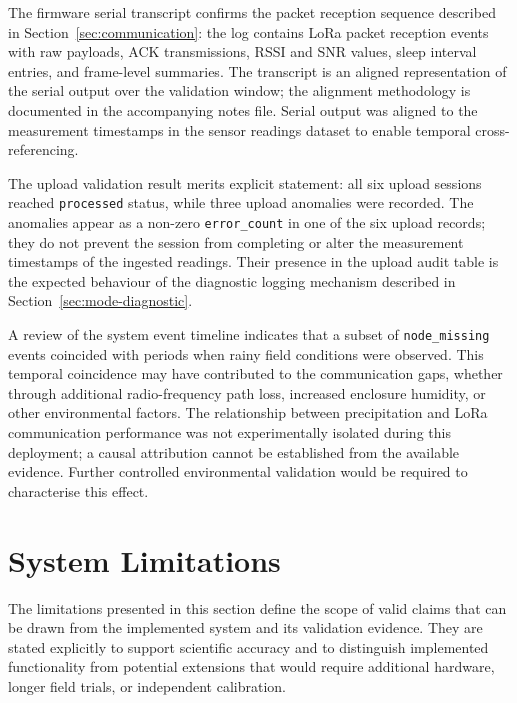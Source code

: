 The firmware serial transcript confirms the packet reception sequence described in Section~\ref{sec:communication}: the log contains LoRa packet reception events with raw payloads, ACK transmissions, RSSI and SNR values, sleep interval entries, and frame-level summaries. The transcript is an aligned representation of the serial output over the validation window; the alignment methodology is documented in the accompanying notes file. Serial output was aligned to the measurement timestamps in the sensor readings dataset to enable temporal cross-referencing.

The upload validation result merits explicit statement: all six upload sessions reached \texttt{processed} status, while three upload anomalies were recorded. The anomalies appear as a non-zero \texttt{error\_count} in one of the six upload records; they do not prevent the session from completing or alter the measurement timestamps of the ingested readings. Their presence in the upload audit table is the expected behaviour of the diagnostic logging mechanism described in Section~\ref{sec:mode-diagnostic}.

A review of the system event timeline indicates that a subset of \texttt{node\_missing} events coincided with periods when rainy field conditions were observed. This temporal coincidence may have contributed to the communication gaps, whether through additional radio-frequency path loss, increased enclosure humidity, or other environmental factors. The relationship between precipitation and LoRa communication performance was not experimentally isolated during this deployment; a causal attribution cannot be established from the available evidence. Further controlled environmental validation would be required to characterise this effect.

\section{System Limitations}
\label{sec:limitations}

The limitations presented in this section define the scope of valid claims that can be drawn from the implemented system and its validation evidence. They are stated explicitly to support scientific accuracy and to distinguish implemented functionality from potential extensions that would require additional hardware, longer field trials, or independent calibration.

